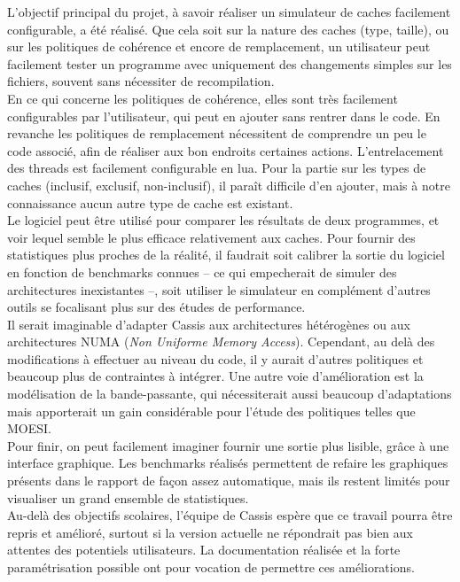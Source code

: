 L'objectif principal du projet, à savoir réaliser un simulateur de caches facilement configurable, a été réalisé. Que cela soit sur la nature des caches (type, taille), ou sur les politiques de cohérence et encore de remplacement, un utilisateur peut facilement tester un programme avec uniquement des changements simples sur les fichiers, souvent sans nécessiter de recompilation. \\

En ce qui concerne les politiques de cohérence, elles sont très facilement configurables par l'utilisateur, qui peut en ajouter sans rentrer dans le code. En revanche les politiques de remplacement nécessitent de comprendre un peu le code associé, afin de réaliser aux bon endroits certaines actions. L'entrelacement des threads est facilement configurable en lua. Pour la partie sur les types de caches (inclusif, exclusif, non-inclusif), il paraît difficile d'en ajouter, mais à notre connaissance aucun autre type de cache est existant.\\

Le logiciel peut être utilisé pour comparer les résultats de deux programmes, et voir lequel semble le plus efficace relativement aux caches. Pour fournir des statistiques plus proches de la réalité, il faudrait soit calibrer la sortie du logiciel en fonction de benchmarks connues -- ce qui empecherait de simuler des architectures inexistantes --, soit utiliser le simulateur en complément d'autres outils se focalisant plus sur des études de performance.\\

Il serait imaginable d'adapter \textsf{Cassis} aux architectures hétérogènes ou aux architectures NUMA (\emph{Non Uniforme Memory Access}). Cependant, au delà des modifications à effectuer au niveau du code, il y aurait d'autres politiques et beaucoup plus de contraintes à intégrer. Une autre voie d'amélioration est la modélisation de la bande-passante, qui nécessiterait aussi beaucoup d'adaptations mais apporterait un gain considérable pour l'étude des politiques telles que MOESI.\\

Pour finir, on peut facilement imaginer fournir une sortie plus lisible, grâce à une interface graphique. Les benchmarks réalisés permettent de refaire les graphiques présents dans le rapport de façon assez automatique, mais ils restent limités pour visualiser un grand ensemble de statistiques. \\

Au-delà des objectifs scolaires, l'équipe de \textsf{Cassis} espère que ce travail pourra être repris et amélioré, surtout si la version actuelle ne répondrait pas bien aux attentes des potentiels utilisateurs. La documentation réalisée et la forte paramétrisation possible ont pour vocation de permettre ces améliorations.
